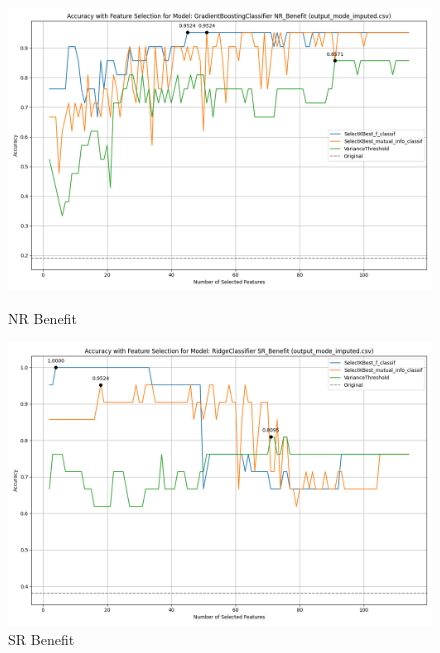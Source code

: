 \begin{figure}[H]
    \centering
    \begin{minipage}[b]{0.45\textwidth}
        \includegraphics[width=\textwidth]{class_all_section/images_class_ensemble_reduction/feature_selection_accuracy_plot_output_mode_imputedcsv_GradientBoostingClassifier_NR_Benefit.png}
        \caption{NR Benefit}
        \label{fig_class_all:nr_ben_featred_graph}
    \end{minipage}
    \hfill
    \begin{minipage}[b]{0.45\textwidth}
        \includegraphics[width=\textwidth]{class_all_section/images_class_ensemble_reduction/feature_selection_accuracy_plot_output_mode_imputedcsv_RidgeClassifier_SR_Benefit.png}
        \caption{SR Benefit}
        \label{fig_class_all:sr_ben_featred_graph}
    \end{minipage}
\end{figure}


